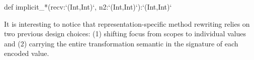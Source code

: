 \begin{lstlisting-nobreak}
def implicit_*(recv:`(Int,Int)`, n2:`(Int,Int)`):`(Int,Int)`
\end{lstlisting-nobreak}

It is interesting to notice that representation-specific method rewriting relies on two previous design choices: (1) shifting focus from scopes to individual values and (2) carrying the entire transformation semantic in the signature of each encoded value. %


%


%
%
%




